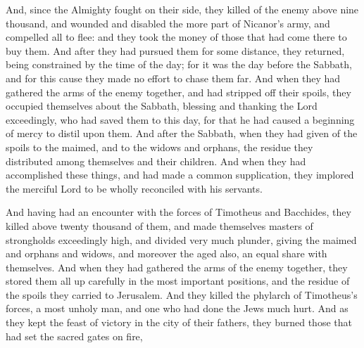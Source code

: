 {And, since the Almighty fought on their side, they killed of the enemy above nine thousand, and wounded and
 disabled the more part of Nicanor’s army, and compelled all to flee:
and they took the money of those that had come there to buy them. And after they had pursued them for some
 distance, they returned, being constrained by the time of the day;
for it was the day before the Sabbath, and for this cause they made no effort to chase them far.
 And when they had gathered
 the arms of the enemy together, and had stripped off their spoils, they occupied themselves about the Sabbath, blessing and thanking the Lord exceedingly, who had saved them to this day, for that he had caused a beginning of mercy to distil upon them.
And after the Sabbath, when they had given of the spoils to the
 maimed, and to the widows and orphans, the residue they distributed among themselves and their children.
And when they had accomplished these things, and had made a common supplication, they implored the merciful Lord to be wholly reconciled with his servants.
\par }{\PP {}And having had an encounter with the forces of Timotheus and Bacchides, they killed above twenty thousand of them, and made themselves masters of strongholds exceedingly high, and divided very much plunder, giving the
 maimed and orphans and widows, and moreover the aged also, an equal share with themselves.
 And when they had gathered the arms
 of the enemy together, they stored them all up carefully in the most important positions, and the residue of the spoils they carried to Jerusalem.
And they killed the
 phylarch of Timotheus’s forces, a most unholy man, and one who had done the Jews much hurt.
 And as they kept the feast of victory in the
 city of their fathers, they burned those that had set the sacred
 gates on fire,
}
